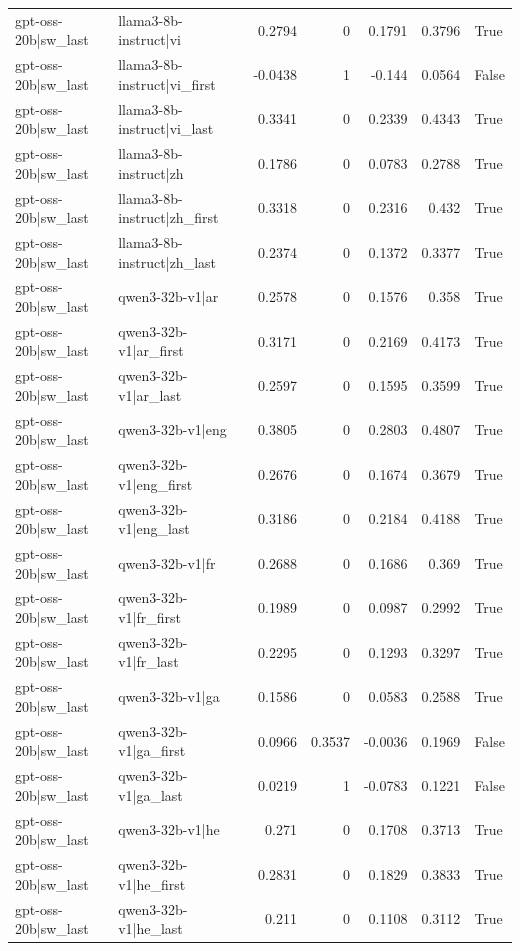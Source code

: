 \begin{table}
\begin{tabular}{l l r r r r l}
gpt-oss-20b|sw_last & llama3-8b-instruct|vi & 0.2794 & 0 & 0.1791 & 0.3796 & True \\
gpt-oss-20b|sw_last & llama3-8b-instruct|vi_first & -0.0438 & 1 & -0.144 & 0.0564 & False \\
gpt-oss-20b|sw_last & llama3-8b-instruct|vi_last & 0.3341 & 0 & 0.2339 & 0.4343 & True \\
gpt-oss-20b|sw_last & llama3-8b-instruct|zh & 0.1786 & 0 & 0.0783 & 0.2788 & True \\
gpt-oss-20b|sw_last & llama3-8b-instruct|zh_first & 0.3318 & 0 & 0.2316 & 0.432 & True \\
gpt-oss-20b|sw_last & llama3-8b-instruct|zh_last & 0.2374 & 0 & 0.1372 & 0.3377 & True \\
gpt-oss-20b|sw_last & qwen3-32b-v1|ar & 0.2578 & 0 & 0.1576 & 0.358 & True \\
gpt-oss-20b|sw_last & qwen3-32b-v1|ar_first & 0.3171 & 0 & 0.2169 & 0.4173 & True \\
gpt-oss-20b|sw_last & qwen3-32b-v1|ar_last & 0.2597 & 0 & 0.1595 & 0.3599 & True \\
gpt-oss-20b|sw_last & qwen3-32b-v1|eng & 0.3805 & 0 & 0.2803 & 0.4807 & True \\
gpt-oss-20b|sw_last & qwen3-32b-v1|eng_first & 0.2676 & 0 & 0.1674 & 0.3679 & True \\
gpt-oss-20b|sw_last & qwen3-32b-v1|eng_last & 0.3186 & 0 & 0.2184 & 0.4188 & True \\
gpt-oss-20b|sw_last & qwen3-32b-v1|fr & 0.2688 & 0 & 0.1686 & 0.369 & True \\
gpt-oss-20b|sw_last & qwen3-32b-v1|fr_first & 0.1989 & 0 & 0.0987 & 0.2992 & True \\
gpt-oss-20b|sw_last & qwen3-32b-v1|fr_last & 0.2295 & 0 & 0.1293 & 0.3297 & True \\
gpt-oss-20b|sw_last & qwen3-32b-v1|ga & 0.1586 & 0 & 0.0583 & 0.2588 & True \\
gpt-oss-20b|sw_last & qwen3-32b-v1|ga_first & 0.0966 & 0.3537 & -0.0036 & 0.1969 & False \\
gpt-oss-20b|sw_last & qwen3-32b-v1|ga_last & 0.0219 & 1 & -0.0783 & 0.1221 & False \\
gpt-oss-20b|sw_last & qwen3-32b-v1|he & 0.271 & 0 & 0.1708 & 0.3713 & True \\
gpt-oss-20b|sw_last & qwen3-32b-v1|he_first & 0.2831 & 0 & 0.1829 & 0.3833 & True \\
gpt-oss-20b|sw_last & qwen3-32b-v1|he_last & 0.211 & 0 & 0.1108 & 0.3112 & True \\

\end{tabular}
\end{table}
